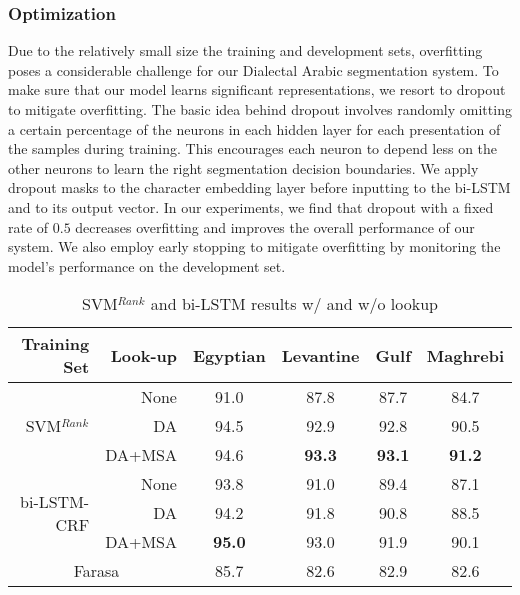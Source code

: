 \documentclass[11pt,letterpaper]{article}
\begin{document}
\subsubsection{Optimization}
Due to the relatively small size the training and development sets, overfitting poses a considerable challenge for our Dialectal Arabic segmentation system. To make sure that our model learns significant representations, we resort to dropout \cite{hinton:2012} to mitigate overfitting. The basic idea behind dropout involves randomly omitting a certain percentage of the neurons in each hidden layer for each presentation of the samples during training. This encourages each neuron to depend less on the other neurons to learn the right segmentation decision boundaries.
We apply dropout masks to the character embedding layer before inputting to the bi-LSTM and to its output vector. In our experiments, we find that dropout with a fixed rate of $0.5$ decreases overfitting and improves the overall performance of our system.
We also employ early stopping \cite{caruana2000,graves2013speech} to mitigate overfitting by monitoring the model's performance on the development set.

\begin{table*}[ht]
\begin{center}
\begin{tabular}{r|r|c|c|c|c}
Training Set & Look-up & Egyptian & Levantine & Gulf & Maghrebi \\ \hline
\multirow{3}{*}{SVM$^{Rank}$} & None 		& 91.0 & 87.8 & 87.7 & 84.7 \\
					& DA 		& 94.5 & 92.9 & 92.8 & 90.5 \\
					& DA+MSA 	& 94.6 & \textbf{93.3} & \textbf{93.1} & \textbf{91.2} \\ \hline
\multirow{3}{*}{bi-LSTM-CRF} & None 		& 93.8 & 91.0 & 89.4 & 87.1  \\
					& DA 		& 94.2 & 91.8 &90.8  & 88.5  \\
					& DA+MSA 	& \textbf{95.0} & 93.0 & 91.9 & 90.1  \\ \hline
\multicolumn{2}{c|}{Farasa}      & 85.7	& 82.6	& 82.9	& 82.6 \\ \hline

\end{tabular}
\label{SVMvbiLSTMCRFRes}
\caption{SVM$^{Rank}$ and bi-LSTM results w/ and w/o lookup}
\end{center}
\vspace{-1.5em}
\end{table*}
\end{document}

